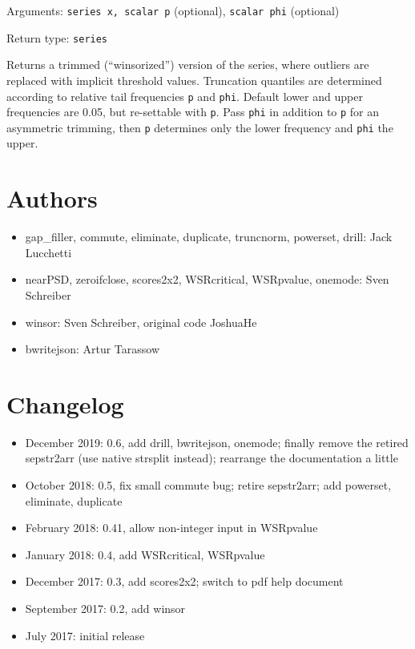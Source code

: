 \documentclass[11pt,english]{article}
\begin{document}
Arguments: \texttt{series x, scalar p} (optional), \texttt{scalar
phi} (optional) 

\noindent Return type: \texttt{series}

Returns a trimmed (``winsorized'') version
of the series, where outliers are replaced with implicit threshold
values. Truncation quantiles are determined according to relative
tail frequencies \texttt{p} and \texttt{phi}. Default lower and upper
frequencies are 0.05, but re-settable with \texttt{p}. Pass \texttt{phi}
in addition to \texttt{p} for an asymmetric trimming, then \texttt{p}
determines only the lower frequency and \texttt{phi} the upper. 

\section{Authors}
\begin{itemize}
\item gap\_filler, commute, eliminate, duplicate, truncnorm, powerset, drill:
 Jack Lucchetti

\item nearPSD, zeroifclose, scores2x2, WSRcritical, WSRpvalue, onemode:
Sven Schreiber 

\item winsor: Sven Schreiber, original code JoshuaHe
\item bwritejson: Artur Tarassow

\end{itemize}

\section{Changelog }
\begin{itemize}
\item December 2019: 0.6, add drill, bwritejson, onemode; %
    finally remove the retired sepstr2arr (use native strsplit instead);
    rearrange the documentation a little
\item October 2018: 0.5, fix small commute bug; retire sepstr2arr; add powerset,
  eliminate, duplicate
\item February 2018: 0.41, allow non-integer input in WSRpvalue
\item January 2018: 0.4, add WSRcritical, WSRpvalue
\item December 2017: 0.3, add scores2x2; switch to pdf help document
\item September 2017: 0.2, add winsor 
\item July 2017: initial release
\end{itemize}
\end{document}
